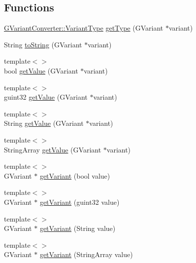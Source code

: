 \subsection*{Functions}
\begin{DoxyCompactItemize}
\item 
\mbox{\hyperlink{namespaceGVariantConverter_a3d2966908c9f278ec06ff1632cd718bb}{G\+Variant\+Converter\+::\+Variant\+Type}} \mbox{\hyperlink{namespaceGVariantConverter_a26d762544766cc216830eb6ad928cc48}{get\+Type}} (G\+Variant $\ast$variant)
\item 
String \mbox{\hyperlink{namespaceGVariantConverter_ae1f44e27a6e117d6ff1b7f1292a059e5}{to\+String}} (G\+Variant $\ast$variant)
\item 
{\footnotesize template$<$$>$ }\\bool \mbox{\hyperlink{namespaceGVariantConverter_a700fa284504b8bdc27f2625e101aaf1c}{get\+Value}} (G\+Variant $\ast$variant)
\item 
{\footnotesize template$<$$>$ }\\guint32 \mbox{\hyperlink{namespaceGVariantConverter_a2c4b976def4cdfc9598680f289b5b536}{get\+Value}} (G\+Variant $\ast$variant)
\item 
{\footnotesize template$<$$>$ }\\String \mbox{\hyperlink{namespaceGVariantConverter_a68fe0397dd1163b905d6758d5a12692c}{get\+Value}} (G\+Variant $\ast$variant)
\item 
{\footnotesize template$<$$>$ }\\String\+Array \mbox{\hyperlink{namespaceGVariantConverter_ad51a4d22cd30d55e33f31b6b7e5e53d0}{get\+Value}} (G\+Variant $\ast$variant)
\item 
{\footnotesize template$<$$>$ }\\G\+Variant $\ast$ \mbox{\hyperlink{namespaceGVariantConverter_a5a165783519acfd197c25d1722d1cdfe}{get\+Variant}} (bool value)
\item 
{\footnotesize template$<$$>$ }\\G\+Variant $\ast$ \mbox{\hyperlink{namespaceGVariantConverter_a30219bdff45548efa5bb3400c6c834ff}{get\+Variant}} (guint32 value)
\item 
{\footnotesize template$<$$>$ }\\G\+Variant $\ast$ \mbox{\hyperlink{namespaceGVariantConverter_a0ca5fe64ee2727a53be255e9e0b30062}{get\+Variant}} (String value)
\item 
{\footnotesize template$<$$>$ }\\G\+Variant $\ast$ \mbox{\hyperlink{namespaceGVariantConverter_ac9970583f14639ff1f3dfc246e427e94}{get\+Variant}} (String\+Array value)

\end{DoxyCompactItemize}
